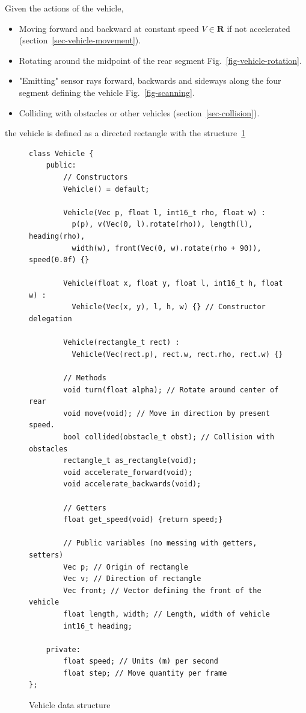 \documentclass[11pt]{article}
\newcommand{\Rb}{\mathbf{R}}
\newcommand{\figref}[1]{Fig.~\eqref{#1}}
\begin{document}
Given the actions of the vehicle,
\begin{itemize}
    \item Moving forward and backward at constant speed $V\in\Rb$ if not accelerated
        (section~\ref{sec-vehicle-movement}).
    \item Rotating around the midpoint of the rear segment
        \figref{fig-vehicle-rotation}.
    \item "Emitting" sensor rays forward, backwards and sideways along the
        four segment defining the vehicle \figref{fig-scanning}.
    \item Colliding with obstacles or other vehicles
        (section~\ref{sec-collision}).
\end{itemize}
the vehicle is defined as a directed rectangle with the
structure~\ref{code-vehicle-data-structure}
\begin{figure}
\begin{verbatim}
class Vehicle {
    public:
        // Constructors
        Vehicle() = default;

        Vehicle(Vec p, float l, int16_t rho, float w) :
          p(p), v(Vec(0, l).rotate(rho)), length(l), heading(rho),
          width(w), front(Vec(0, w).rotate(rho + 90)), speed(0.0f) {}

        Vehicle(float x, float y, float l, int16_t h, float w) :
          Vehicle(Vec(x, y), l, h, w) {} // Constructor delegation

        Vehicle(rectangle_t rect) :
          Vehicle(Vec(rect.p), rect.w, rect.rho, rect.w) {}

        // Methods
        void turn(float alpha); // Rotate around center of rear
        void move(void); // Move in direction by present speed.
        bool collided(obstacle_t obst); // Collision with obstacles
        rectangle_t as_rectangle(void);
        void accelerate_forward(void);
        void accelerate_backwards(void);

        // Getters
        float get_speed(void) {return speed;}

        // Public variables (no messing with getters, setters)
        Vec p; // Origin of rectangle
        Vec v; // Direction of rectangle
        Vec front; // Vector defining the front of the vehicle
        float length, width; // Length, width of vehicle
        int16_t heading;

    private:
        float speed; // Units (m) per second
        float step; // Move quantity per frame
};
\end{verbatim}
\caption{Vehicle data structure}\label{code-vehicle-data-structure}
\end{figure}
\end{document}
